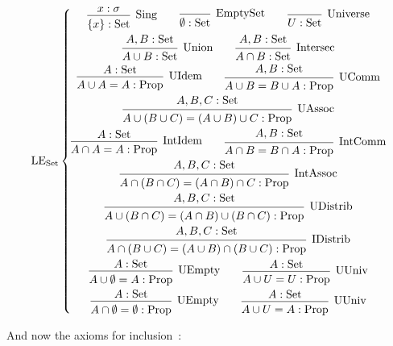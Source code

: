 \documentclass[]{article}
\newcommand{\1}{\mathbbm{1}}
\newcommand{\0}{\mathbbm{0}}
\newcommand{\Prop}{\text{Prop}}
\newcommand{\Set}{\text{Set}}
\newcommand{\proof}[1]{{\scantokens{\begin{prooftree}#1\end{prooftree}}}}
\begin{document}
\[\text{LE}_\text{Set}\left\{
    \begin{gathered}
        \proof{
            \hypo{x:\sigma}
            \infer1[Sing]{\{x\} : \Set}
        }
        \qquad\proof{
            \infer0[EmptySet]{\emptyset : \Set}
        }
        \qquad\proof{
            \infer0[Universe]{U : \Set}
        }\\
        \proof{
            \hypo{A, B : \Set}
            \infer1[Union]{A\cup B : \Set}
        }
        \qquad\proof{
            \hypo{A, B : \Set}
            \infer1[Intersec]{A\cap B: \Set}
        }\\
        \proof{
            \hypo{A : \Set}
            \infer1[UIdem]{A\cup A = A : \Prop}
        }
        \qquad\proof{
            \hypo{A, B : \Set}
            \infer1[UComm]{A\cup B = B\cup A : \Prop}
        }\\
        \proof{
            \hypo{A, B, C : \Set}
            \infer1[UAssoc]{A\cup (B\cup C) = (A\cup B)\cup C : \Prop}
        }\\
        \proof{
            \hypo{A : \Set}
            \infer1[IntIdem]{A\cap A = A : \Prop}
        }
        \qquad\proof{
            \hypo{A, B : \Set}
            \infer1[IntComm]{A\cap B = B\cap A : \Prop}
        }\\
        \proof{
            \hypo{A, B, C : \Set}
            \infer1[IntAssoc]{A\cap (B\cap C) = (A\cap B)\cap C : \Prop}
        }\\
        \proof{
            \hypo{A, B, C : \Set}
            \infer1[UDistrib]{A\cup (B\cap C) =
                              (A\cap B) \cup (B\cap C) : \Prop}
        }\\
        \proof{
            \hypo{A, B, C : \Set}
            \infer1[IDistrib]{A\cap (B\cup C) =
                              (A\cup B) \cap (B\cup C) : \Prop}
        }\\
        \proof{
            \hypo{A : \Set}
            \infer1[UEmpty]{A\cup \emptyset = A : \Prop}
        }
        \qquad\proof{
            \hypo{A : \Set}
            \infer1[UUniv]{A\cup U = U : \Prop}
        }\\
        \proof{
            \hypo{A : \Set}
            \infer1[UEmpty]{A\cap \emptyset =
                            \emptyset : \Prop}
        }
        \qquad\proof{
            \hypo{A : \Set}
            \infer1[UUniv]{A\cup U = A : \Prop}
        }\\
    \end{gathered}
\right.\]

And now the axioms for inclusion~:
\end{document}
